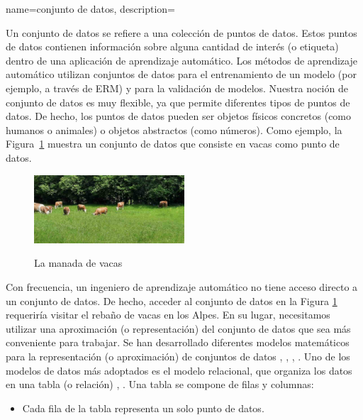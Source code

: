 {name={conjunto de datos},
	description={Un conjunto de datos se refiere a una colección de puntos de datos. Estos 
		puntos de datos contienen información sobre alguna cantidad de interés (o etiqueta) dentro 
		de una aplicación de aprendizaje automático. Los métodos de aprendizaje automático utilizan conjuntos de datos para el entrenamiento de un modelo (por ejemplo, a través de ERM)
		y para la validación de modelos. Nuestra noción de conjunto de datos es muy flexible, 
		ya que permite diferentes tipos de puntos de datos. De hecho, los puntos de datos pueden ser objetos físicos concretos
		(como humanos o animales) o objetos abstractos (como números).
		Como ejemplo, la Figura\ \ref{fig_cows_dataset_dict} muestra un conjunto de datos que consiste en vacas como 
		punto de datos. 
		\begin{figure}[H]
				\begin{center}
		\label{fig:cowsintheswissalps_dict}
		\includegraphics[width=0.5\textwidth]{../../assets/CowsAustria.jpg}
		  \end{center}
		\caption{\label{fig_cows_dataset_dict} La manada de vacas}
	  \end{figure}
	   Con frecuencia, un ingeniero de aprendizaje automático no tiene acceso directo a un conjunto de datos. De hecho, acceder al conjunto de datos en la Figura 
        \ref{fig_cows_dataset_dict} requeriría visitar el rebaño de vacas en los Alpes. En su lugar, 
	   necesitamos utilizar una aproximación (o representación) del conjunto de datos que sea más conveniente para trabajar. 
       Se han desarrollado diferentes modelos matemáticos para la representación (o aproximación) de conjuntos de datos  
       \cite{silberschatz2019database}, \cite{abiteboul1995foundations}, \cite{hoberman2009data}, \cite{ramakrishnan2002database}. 
	   Uno de los modelos de datos más adoptados es el modelo relacional, que organiza los datos
       en una tabla (o relación) \cite{codd1970relational}, \cite{silberschatz2019database}.
	   Una tabla se compone de filas y columnas:
		\begin{itemize} 
		\item Cada fila de la tabla representa un solo punto de datos.

\end{itemize}}}
